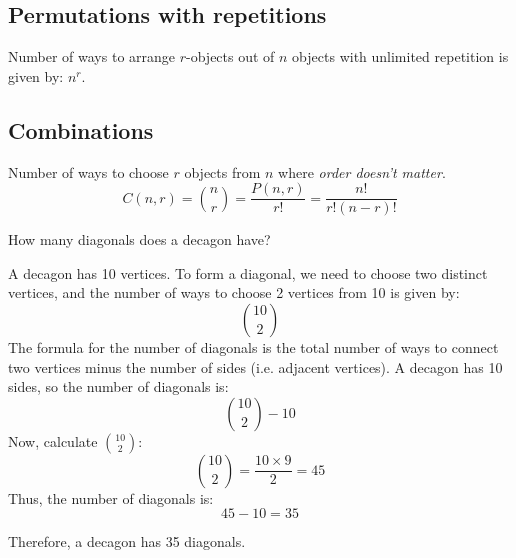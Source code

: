 \subsection{Permutations with repetitions}
    \begin{definition}
        Number of ways to arrange \( r \)-objects out of \( n \) objects with unlimited repetition is given by: $n^r$.
    \end{definition}

\subsection{Combinations}
    \begin{definition}
        Number of ways to choose $r$ objects from $n$ where \emph{order doesn't matter}. 
        \begin{equation}
            C(n,r) = \binom{n}{r} = \frac{P(n,r)}{r!} = \frac{n!}{r!(n-r)!}
        \end{equation}
    \end{definition}

    \begin{example}
        How many diagonals does a decagon have?

        A decagon has 10 vertices. To form a diagonal, we need to choose two distinct vertices, and the number of ways to choose 2 vertices from 10 is given by:
        \[
        \binom{10}{2}
        \]
        The formula for the number of diagonals is the total number of ways to connect two vertices minus the number of sides (i.e. adjacent vertices). A decagon has 10 sides, so the number of diagonals is:
        \[
        \binom{10}{2} - 10
        \]
        Now, calculate \( \binom{10}{2} \):
        \[
        \binom{10}{2} = \frac{10 \times 9}{2} = 45
        \]
        Thus, the number of diagonals is:
        \[
        45 - 10 = 35
        \]

        Therefore, a decagon has 35 diagonals.
    \end{example}

